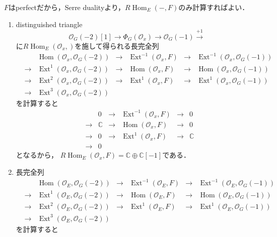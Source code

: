 \documentclass[uplatex,a4paper,11pt,dvipdfmx]{jsarticle}
\makeatletter
\theoremstyle{mystyle} %
\renewenvironment{proof}[1][\proofname]{\par
 \pushQED{\qed}%
 \normalfont \topsep6\p@\@plus6\p@\relax
 \trivlist
 \item[\hskip\labelsep
 \itshape
 {\bf\underline{#1}}]\ignorespaces
}{%
 \popQED\endtrivlist\@endpefalse
}
\DeclareMathOperator{\Hom}{Hom}
\DeclareMathOperator{\Ext}{Ext}
\makeatother
\begin{document}
\begin{proof}
	$F$はperfectだから，Serre dualityより，$R\Hom_E(-, F)$のみ計算すればよい．
	\begin{enumerate}
		\item distinguished triangle $$\mathcal{O}_G(-2)[1]\to \Phi_G(\mathcal{O}_x)\to \mathcal{O}_G(-1) \xrightarrow{+1} $$に$R\Hom_E(\mathcal{O}_x, )$を施して得られる長完全列\[
			      \begin{array}{ccccccc}

				       &     & \Hom(\mathcal{O}_x, \mathcal{O}_G(-2))    & \to & \Ext^{-1}(\mathcal{O}_x, F) & \to & \Ext^{-1}(\mathcal{O}_x, \mathcal{O}_G(-1)) \\
				       & \to & \Ext^1(\mathcal{O}_x, \mathcal{O}_G(-2))  & \to & \Hom(\mathcal{O}_x, F)      & \to & \Hom(\mathcal{O}_x, \mathcal{O}_G(-1))      \\
				       & \to & \Ext^2(\mathcal{O}_x, \mathcal{O}_G(-2))  & \to & \Ext^1(\mathcal{O}_x,F)     & \to & \Ext^1(\mathcal{O}_x, \mathcal{O}_G(-1))    \\
				       & \to & \Ext^3(\mathcal{O}_x, \mathcal{O}_G(-2) ) &     &                             &     &
			      \end{array}
		      \]を計算すると\[
			      \begin{array}{ccccccc}

				       &     & 0          & \to & \Ext^{-1}(\mathcal{O}_x, F) & \to & 0          \\
				       & \to & \mathbb{C} & \to & \Hom(\mathcal{O}_x, F)      & \to & 0          \\
				       & \to & 0          & \to & \Ext^1(\mathcal{O}_x,F)     & \to & \mathbb{C} \\
				       & \to & 0          &     &                             &     &
			      \end{array}
		      \]となるから， $R\Hom_E(\mathcal{O}_x, F) = \mathbb{C} \oplus \mathbb{C}[-1]$である．
		\item 長完全列\[
			      \begin{array}{ccccccc}

				       &     & \Hom(\mathcal{O}_E, \mathcal{O}_G(-2))    & \to & \Ext^{-1}(\mathcal{O}_E, F) & \to & \Ext^{-1}(\mathcal{O}_E, \mathcal{O}_G(-1)) \\
				       & \to & \Ext^1(\mathcal{O}_E, \mathcal{O}_G(-2))  & \to & \Hom(\mathcal{O}_E, F)      & \to & \Hom(\mathcal{O}_E, \mathcal{O}_G(-1))      \\
				       & \to & \Ext^2(\mathcal{O}_E, \mathcal{O}_G(-2))  & \to & \Ext^1(\mathcal{O}_E,F)     & \to & \Ext^1(\mathcal{O}_E, \mathcal{O}_G(-1))    \\
				       & \to & \Ext^3(\mathcal{O}_E, \mathcal{O}_G(-2) ) &     &                             &     &
			      \end{array}
		      \]を計算すると\[
			      \begin{array}{ccccccc}


\end{array}\]
\end{enumerate}
\end{proof}
\end{document}
